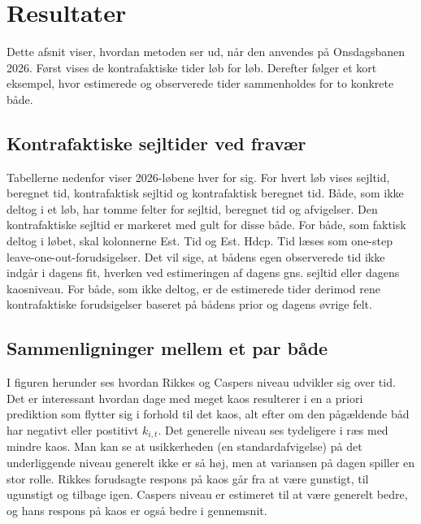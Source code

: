 \newpage
\section{Resultater}
Dette afsnit viser, hvordan metoden ser ud, når den anvendes på Onsdagsbanen 2026. Først vises de kontrafaktiske tider løb for løb. Derefter følger et kort eksempel, hvor estimerede og observerede tider sammenholdes for to konkrete både.

\subsection*{Kontrafaktiske sejltider ved fravær}
Tabellerne nedenfor viser 2026-løbene hver for sig. For hvert løb vises sejltid, beregnet tid, kontrafaktisk sejltid og kontrafaktisk beregnet tid.
Både, som ikke deltog i et løb, har tomme felter for sejltid, beregnet tid og afvigelser. Den kontrafaktiske sejltid er markeret med gult for disse både.
For både, som faktisk deltog i løbet, skal kolonnerne Est. Tid og Est. Hdcp. Tid læses som one-step leave-one-out-forudsigelser. Det vil sige, at bådens egen observerede tid ikke indgår i dagens fit, hverken ved estimeringen af dagens gns. sejltid eller dagens kaosniveau. For både, som ikke deltog, er de estimerede tider derimod rene kontrafaktiske forudsigelser baseret på bådens prior og dagens øvrige felt.



\subsection{Sammenligninger mellem et par både}
I figuren herunder ses hvordan Rikkes og Caspers niveau udvikler sig over tid.
Det er interessant hvordan dage med meget kaos resulterer i en a priori prediktion som flytter sig i forhold til det kaos, alt efter om den pågældende båd har negativt eller postitivt $k_{i,t}$. Det generelle niveau ses tydeligere i ræs med mindre kaos. Man kan se at usikkerheden (en standardafvigelse) på det underliggende niveau generelt ikke er så høj, men at variansen på dagen spiller en stor rolle. Rikkes forudsagte respons på kaos går fra at være gunstigt, til ugunstigt og tilbage igen. Caspers niveau er estimeret til at være generelt bedre, og hans respons på kaos er også bedre i gennemsnit.


